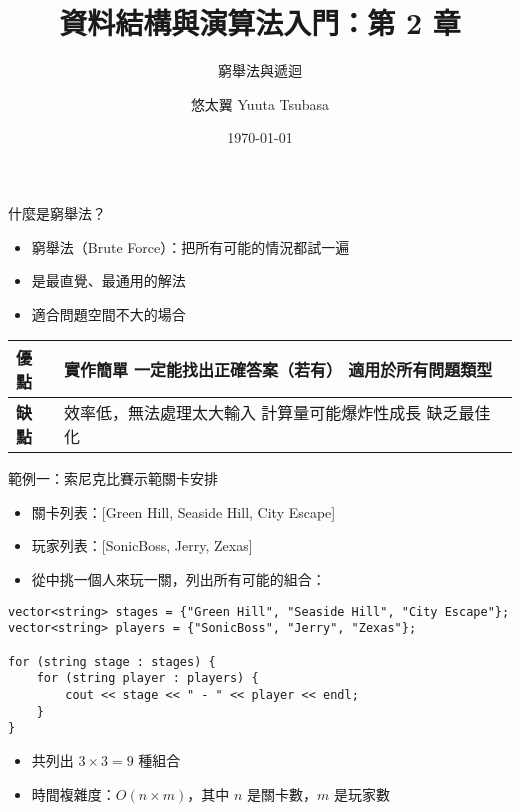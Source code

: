 \documentclass{beamer}
\begin{document}
\title{資料結構與演算法入門：第 2 章}
\subtitle{窮舉法與遞迴}
\author{悠太翼 Yuuta Tsubasa}
\date{\today}

\frame{\titlepage}

\begin{frame}{什麼是窮舉法？}
\begin{itemize}
    \item 窮舉法（Brute Force）：把所有可能的情況都試一遍
    \item 是最直覺、最通用的解法
    \item 適合問題空間不大的場合
\end{itemize}

\vspace{1em}

\begin{center}
\renewcommand{\arraystretch}{1.4}
\begin{tabular}{|>{\centering\arraybackslash}m{3cm}|>{\raggedright\arraybackslash}m{6.5cm}|}
\hline
\textbf{優點} & 
實作簡單 \newline
一定能找出正確答案（若有） \newline
適用於所有問題類型 \\
\hline
\textbf{缺點} & 
效率低，無法處理太大輸入 \newline
計算量可能爆炸性成長 \newline
缺乏最佳化 \\
\hline
\end{tabular}
\end{center}
\end{frame}

\begin{frame}[fragile]{範例一：索尼克比賽示範關卡安排}
\begin{itemize}
    \item 關卡列表：[Green Hill, Seaside Hill, City Escape]
    \item 玩家列表：[SonicBoss, Jerry, Zexas]
    \item 從中挑一個人來玩一關，列出所有可能的組合：
\end{itemize}

\begin{lstlisting}[style=cppstyle]
vector<string> stages = {"Green Hill", "Seaside Hill", "City Escape"};
vector<string> players = {"SonicBoss", "Jerry", "Zexas"};

for (string stage : stages) {
    for (string player : players) {
        cout << stage << " - " << player << endl;
    }
}
\end{lstlisting}

\begin{itemize}
    \item 共列出 $3 \times 3 = 9$ 種組合
    \item 時間複雜度：$O(n \times m)$，其中 $n$ 是關卡數，$m$ 是玩家數
\end{itemize}
\end{frame}
\end{document}
